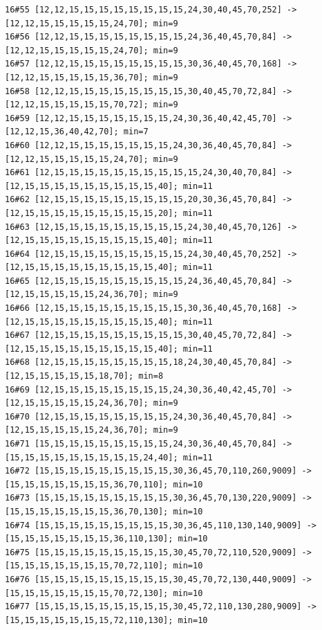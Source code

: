 \documentclass[11pt,a4paper]{article}
\begin{document}
\begin{Verbatim}[breaklines,breakanywhere,fontsize=\footnotesize]
16#55 [12,12,15,15,15,15,15,15,15,15,24,30,40,45,70,252] -> [12,12,15,15,15,15,15,24,70]; min=9
16#56 [12,12,15,15,15,15,15,15,15,15,24,36,40,45,70,84] -> [12,12,15,15,15,15,15,24,70]; min=9
16#57 [12,12,15,15,15,15,15,15,15,15,30,36,40,45,70,168] -> [12,12,15,15,15,15,15,36,70]; min=9
16#58 [12,12,15,15,15,15,15,15,15,15,30,40,45,70,72,84] -> [12,12,15,15,15,15,15,70,72]; min=9
16#59 [12,12,15,15,15,15,15,15,15,24,30,36,40,42,45,70] -> [12,12,15,36,40,42,70]; min=7
16#60 [12,12,15,15,15,15,15,15,15,24,30,36,40,45,70,84] -> [12,12,15,15,15,15,15,24,70]; min=9
16#61 [12,15,15,15,15,15,15,15,15,15,15,24,30,40,70,84] -> [12,15,15,15,15,15,15,15,15,15,40]; min=11
16#62 [12,15,15,15,15,15,15,15,15,15,20,30,36,45,70,84] -> [12,15,15,15,15,15,15,15,15,15,20]; min=11
16#63 [12,15,15,15,15,15,15,15,15,15,24,30,40,45,70,126] -> [12,15,15,15,15,15,15,15,15,15,40]; min=11
16#64 [12,15,15,15,15,15,15,15,15,15,24,30,40,45,70,252] -> [12,15,15,15,15,15,15,15,15,15,40]; min=11
16#65 [12,15,15,15,15,15,15,15,15,15,24,36,40,45,70,84] -> [12,15,15,15,15,15,24,36,70]; min=9
16#66 [12,15,15,15,15,15,15,15,15,15,30,36,40,45,70,168] -> [12,15,15,15,15,15,15,15,15,15,40]; min=11
16#67 [12,15,15,15,15,15,15,15,15,15,30,40,45,70,72,84] -> [12,15,15,15,15,15,15,15,15,15,40]; min=11
16#68 [12,15,15,15,15,15,15,15,15,18,24,30,40,45,70,84] -> [12,15,15,15,15,15,18,70]; min=8
16#69 [12,15,15,15,15,15,15,15,15,24,30,36,40,42,45,70] -> [12,15,15,15,15,15,24,36,70]; min=9
16#70 [12,15,15,15,15,15,15,15,15,24,30,36,40,45,70,84] -> [12,15,15,15,15,15,24,36,70]; min=9
16#71 [15,15,15,15,15,15,15,15,15,24,30,36,40,45,70,84] -> [15,15,15,15,15,15,15,15,15,24,40]; min=11
16#72 [15,15,15,15,15,15,15,15,15,30,36,45,70,110,260,9009] -> [15,15,15,15,15,15,15,36,70,110]; min=10
16#73 [15,15,15,15,15,15,15,15,15,30,36,45,70,130,220,9009] -> [15,15,15,15,15,15,15,36,70,130]; min=10
16#74 [15,15,15,15,15,15,15,15,15,30,36,45,110,130,140,9009] -> [15,15,15,15,15,15,15,36,110,130]; min=10
16#75 [15,15,15,15,15,15,15,15,15,30,45,70,72,110,520,9009] -> [15,15,15,15,15,15,15,70,72,110]; min=10
16#76 [15,15,15,15,15,15,15,15,15,30,45,70,72,130,440,9009] -> [15,15,15,15,15,15,15,70,72,130]; min=10
16#77 [15,15,15,15,15,15,15,15,15,30,45,72,110,130,280,9009] -> [15,15,15,15,15,15,15,72,110,130]; min=10
\end{Verbatim}
\end{document}
